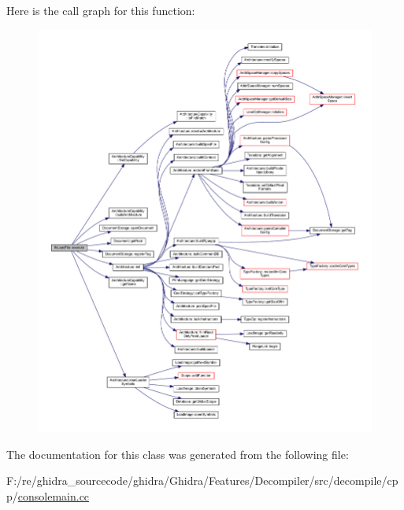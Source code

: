 Here is the call graph for this function\+:
\nopagebreak
\begin{figure}[H]
\begin{center}
\leavevmode
\includegraphics[width=350pt]{class_ifc_load_file_af7ea7408b40db6c11eff2a4f99f4ef80_cgraph}
\end{center}
\end{figure}


The documentation for this class was generated from the following file\+:\begin{DoxyCompactItemize}
\item 
F\+:/re/ghidra\+\_\+sourcecode/ghidra/\+Ghidra/\+Features/\+Decompiler/src/decompile/cpp/\mbox{\hyperlink{consolemain_8cc}{consolemain.\+cc}}\end{DoxyCompactItemize}
